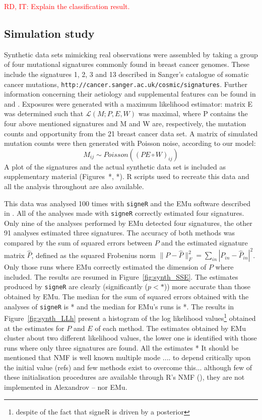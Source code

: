\documentclass{bioinfo}
\begin{document}
\textcolor{red}{RD, IT: Explain the classification result.}

\subsection{Simulation study}
Synthetic data sets mimicking real observations were assembled by
taking a group of four mutational signatures commonly found in 
breast cancer genomes. These include the signatures 1, 2, 3 and 13
described in Sanger's catalogue of somatic cancer mutations, 
\verb~http://cancer.sanger.ac.uk/cosmic/signatures~.
Further information concerning their aetiology and supplemental
features can be found in \cite{HEN} and
\cite{ANat}. Exposures were generated with a maximum likelihood 
estimator: matrix E was determined such that  $\mathcal L(M; P,E,W)$ 
was maximal, where P contains the four above mentioned signatures and 
M and W are, respectively, the mutation counts and opportunity from 
the 21 breast cancer data set. A matrix of simulated mutation counts 
were then generated with Poisson noise, according to our model:
\begin{equation}
  \label{eqn:simulation_matrix}
     M_{ij} \sim Poisson((PE\circ W)_{ij})
\end{equation} 
A plot of the signatures and the actual synthetic data set is included
as supplementary material (Figures~*, *).  R scripts used to recreate
this data and all the analysis throughout are also available. 

This data was analysed 100 times with \texttt{signeR} and the EMu
software described in \cite{FICMV}. All of the analyses made with
\texttt{signeR} correctly estimated four signatures. Only nine of the
analyses performed by EMu detected four signatures, the other 91
analyses estimated three signatures.  The accuracy of both methods was
compared by the sum of squared errors between $P$ and the estimated
signature matrix $\widehat P$, defined as the
squared Frobenius norm $\| P - \widehat P\|_F^2 = \sum_{in} |P_{in} -
\widehat P_{in}|^2$. Only those runs where EMu correctly estimated the
dimension of $P$ where included. The results are resumed in
Figure~\ref{fig:synth_SSE}. The estimates produced by \texttt{signeR}
are clearly (significantly ($p<*$)) more accurate than those obtained by
EMu. The median for the sum of squared errors obtained with the
analyses of \texttt{signeR} is * and the median for EMu's runs is 
*. The results in Figure~\ref{fig:synth_LLh} present a
histogram of the log likelihood values\footnote{despite of the fact
that signeR is driven by a  posterior} obtained at the estimates for 
$P$ and $E$ of each method. The estimates obtained by EMu cluster
about two different likelihood values, the lower one is identified
with those runs where only three signatures are found. All the
estimates * It should be mentioned that NMF is well known multiple
mode .... to depend critically upon the initial value (refs) and few 
methods exist to overcome this... although few of these initialisation
procedures are available through R's NMF (\cite{GS}), they are not
implemented in Alexandrov -- nor EMu.
\end{document}
